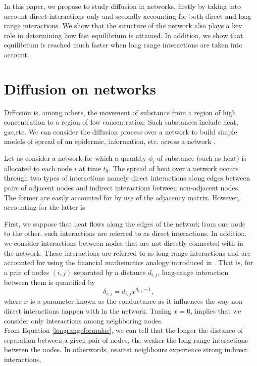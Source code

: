 \documentclass[10pt,a4paper]{article}
\begin{document}
In this paper, we propose to study diffusion in networks, firstly by taking into account direct interactions only and secondly accounting for both direct and long range interactions.
We show that the structure of the network also plays a key role in determining how fast equilibrium is attained.
In addition, we show that equilibrium is reached much faster when long range interactions are taken into account.

\section{Diffusion on networks }
Diffusion is, among others, the movement of substance from a region of high concentration to a region of low concentration. Such substances include heat, gas,etc. We can consider the diffusion process over a network to build simple models of spread of an epidermic, information, etc. across a network \cite{newman2010networks}.

Let us consider a network for which a quantity $\phi_i$ of substance (such as heat) is allocated to each node $i$ at time $t_0$. The spread of heat over a network occurs through two types of interactions namely direct interactions along edges between pairs of adjacent nodes and indirect interactions between non-adjacent nodes. The former are easily accounted for by use of the adjacency matrix. However, accounting for the latter is 

First, we suppose that heat flows along the edges of the network from one node to the other. such interactions are referred to as direct interactions. In addition, we consider interactions between nodes that are not directly connected with in the network. These interactions are referred to as long range interactions and are accounted for using the financial mathematics analogy introduced in \cite{estrada2011epidemic}. That is, for a pair of nodes $(i,j)$ separated by a distance $d_{i,j}$, long-range interaction between them is quantified by 
\begin{equation}
\delta_{i,j} = d_{i,j} x^{d_{i,j}-1},
\label{longrangeformulae}
\end{equation} 
where $x$ is a parameter known as the conductance as it influences the way non direct interactions happen with in the network. Tuning $x=0$, implies that we consider only interactions among neighboring nodes. \\

From Equation \ref{longrangeformulae}, we can tell that the longer the distance of separation between a given pair of nodes, the weaker the long-range interactions between the nodes. In otherwords, nearest neighbours experience strong indirect interactions.
\end{document}
